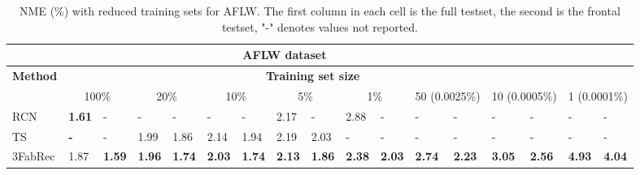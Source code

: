 \documentclass[10pt,twocolumn,letterpaper]{article}
\begin{document}
\begin{table*}[ht]
	\footnotesize
	\begin{center}
		\begin{tabular}{p{1.47cm}| 
				p{0.31cm}p{0.31cm}| p{0.31cm}p{0.31cm}| p{0.31cm}p{0.31cm} | p{0.31cm}p{0.31cm}| p{0.31cm}p{0.31cm}| p{0.31cm}p{0.31cm}| p{0.31cm}p{0.31cm} | p{0.31cm}p{0.31cm}}
			\toprule
			\multicolumn{15}{c}{\bfseries  AFLW dataset}  \\
			\toprule
			\bfseries Method     &  \multicolumn{14}{c}{\bfseries  Training set size}  \\
			&    \multicolumn{2}{c}{100\%} &   \multicolumn{2}{c}{20\%}   & \multicolumn{2}{c}{10\%}    &   \multicolumn{2}{c}{5\%}    & \multicolumn{2}{c}{1\%} &   \multicolumn{2}{c}{50 (0.0025\%)} &  \multicolumn{2}{c}{10 (0.0005\%)} & \multicolumn{2}{c}{1 (0.0001\%)} \\
			\toprule
			RCN \cite{Honari2018} 	&\bf 1.61& - 	& - 	& - 	& - 	& - 	& 2.17 & - 	    &  2.88  & - 	& - 	& - 	& -  	& - 	& -    & -     \\  
			TS \cite{Dong2019}    	&\bf - 	& - 	&   1.99 	& 1.86 	& 2.14 	& 1.94 	& 2.19 & 2.03 	&   -    &  -   & -     & - 	& - 	& -  	& - 	& -\\    
			\midrule
			3FabRec         			&   1.87 & \bf 1.59 &  \bf 1.96 & \bf 1.74 & \bf 2.03 & \bf 1.74 & \bf 2.13 & \bf 1.86 & \bf 2.38 & \bf 2.03 & \bf 2.74 & \bf 2.23  & \bf 3.05 & \bf 2.56 & \bf 4.93 & \bf 4.04\\  
			\midrule
			\bottomrule
		\end{tabular}	
	\end{center}
	\vspace{-0.5cm}
	\caption{\small NME (\%) with reduced training sets for AFLW. The first column in each cell is the full testset, the second is the frontal testset, "-" denotes values not reported.}	
	\label{tab:fewshotAFLW}
	\vspace{-0.0cm}
\end{table*}
\end{document}
